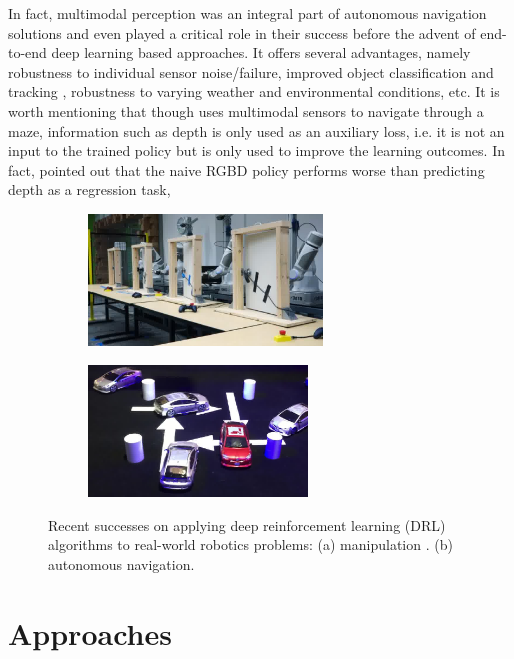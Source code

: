 \documentclass[../thesis.tex]{subfiles}
\begin{document}
In fact, multimodal perception was an integral part of autonomous navigation solutions and even played a critical role in their success \cite{multimodaltartan} before the advent of end-to-end deep learning based approaches. 
It offers several advantages, namely robustness to individual sensor noise/failure, improved object classification and tracking \cite{elfring2016multisensor, cho2014multi, darms2008classification}, robustness to varying weather and environmental conditions, etc. 
It is worth mentioning that though \citet{mirowski2017a} uses multimodal sensors to navigate through a maze, information such as depth is only used as an auxiliary loss, i.e. it is not an input to the trained policy but is only used to improve the learning outcomes. 
In fact, \citet{mirowski2017a} pointed out that the naive RGBD policy performs worse than predicting depth as a regression task,


\begin{figure}[b]
	\vskip -0.1in
    \centering
    \begin{subfigure}[b]{0.45\linewidth}
        \includegraphics[height=3.5cm]{./Introduction/fig/drl_manipulation.jpg}
    \end{subfigure}
    \begin{subfigure}[b]{0.45\linewidth}
        \includegraphics[height=3.5cm]{./Introduction/fig/drl_perfer_network.jpg}
    \end{subfigure}
    \caption{Recent successes on applying deep reinforcement learning (DRL) algorithms to real-world robotics problems: (a) manipulation \cite{gu2016deep}. (b) autonomous navigation. \cite{prefernetwork}}
    \label{fig:end-to-end}
\end{figure}


\section{Approaches}
\end{document}
